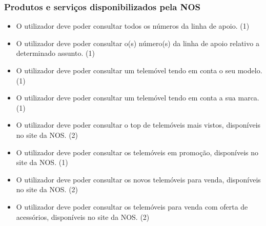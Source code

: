 \documentclass[11pt,a4paper]{article}
\newcommand{\requirement}[3]{
    #1 (#3)
}
\begin{document}
\begin{appendices}
\subsubsection{Produtos e serviços disponibilizados pela NOS}
\begin{itemize}
    \setlength\itemsep{0em}
    \item \requirement{O utilizador deve poder consultar todos os números da linha de apoio.}
    {Quando o utilizador não tem a certeza do assunto mais adequado para a sua questão, deve-se 
    disponibilizar todos os números da linha de apoio de forma a facilitar a escolha por parte do utilizador.}{1}
    \item \requirement{O utilizador deve poder consultar o(s) número(s) da linha de apoio relativo a determinado assunto.}
    {A consulta do(s) número(s) da linha de apoio para determinado assunto permite aos utilizadores obter a ajuda adequada à sua questão.}{1}
    \item \requirement{O utilizador deve poder consultar um telemóvel tendo em conta o seu modelo.}
    {A consulta dos telemóveis por modelo permite aos utilizadores restringir a sua consulta ao item de interesse.}{1}
    \item \requirement{O utilizador deve poder consultar um telemóvel tendo em conta a sua marca.}
    {A consulta dos telemóveis por marca permite aos utilizadores restringir a sua consulta ao item de interesse.}{1}
    \item \requirement{O utilizador deve poder consultar o top de telemóveis mais vistos, disponíveis no site da NOS.}
    {A consulta do top de telemóveis mais vistos permite aos utilizadores obter informações sobre os telemóveis mais populares no momento.}{2}
    \item \requirement{O utilizador deve poder consultar os telemóveis em promoção, disponíveis no site da NOS.}
    {A consulta dos telemóveis em promoção permite aos utilizadores tirarem proveito das campanhas promocionais da NOS.}{1}
    \item \requirement{O utilizador deve poder consultar os novos telemóveis para venda, disponíveis no site da NOS.}
    {A consulta dos telemóveis mais recentes permite aos utilizadores estarem mais facilmente a par das novidades tecnológicas.}{2}
    \item \requirement{O utilizador deve poder consultar os telemóveis para venda com oferta de acessórios, disponíveis no site da NOS.}
    {A consulta dos telemóveis para venda com oferta de acessórios permite aos utilizadores tirarem proveito das campanhas promocionais da NOS.}{2}

\end{itemize}
\end{appendices}
\end{document}
